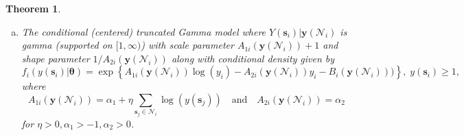 \documentclass[12pt]{article}
\newtheorem{theorem}{Theorem}
\theoremstyle{definition}
\begin{document}
\begin{theorem}
\begin{enumerate}[(a)]
\item The conditional (centered) truncated Gamma model where $Y(\boldsymbol s_i)|\boldsymbol y(\mathcal{N}_i)$ is gamma (supported on $[1, \infty)$) with scale parameter $A_{1i}(\boldsymbol y(\mathcal{N}_i)) + 1$ and shape parameter $1/A_{2i}(\boldsymbol y(\mathcal{N}_i))$ along with conditional density given by
$$
f_i(y(\boldsymbol s_i) | \boldsymbol \theta) = \exp \left\{A_{1i}(\boldsymbol y(\mathcal{N}_i)) \log(y_i) - A_{2i}(\boldsymbol y(\mathcal{N}_i)) y_i -B_i(\boldsymbol y(\mathcal{N}_i))) \right\}, \; y(\boldsymbol s_i) \ge 1,
$$
where
$$
A_{1i}(\boldsymbol y(\mathcal{N}_i)) = \alpha_1 + \eta \sum\limits_{\boldsymbol s_j \in \mathcal{N}_i}\log(y(\boldsymbol s_j)) \quad \text{and} \quad A_{2i}(\boldsymbol y(\mathcal{N}_i)) = \alpha_2
$$
for $\eta > 0, \alpha_1 >-1,  \alpha_2 > 0$.
\end{enumerate}
\end{theorem}
\end{document}
